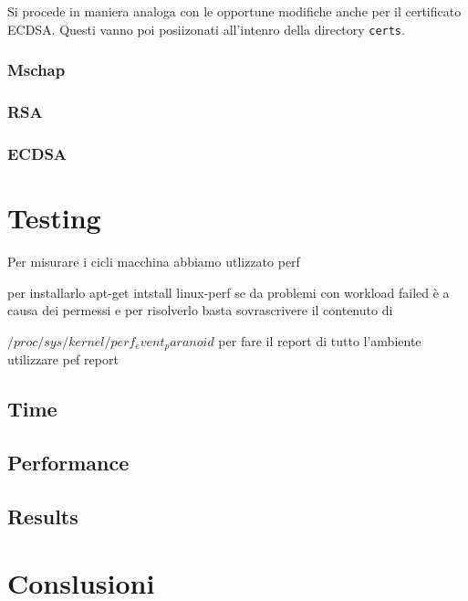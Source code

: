 \documentclass[
10pt, %
a4paper, %
oneside, %
headinclude,footinclude, %
BCOR5mm, %
]{scrartcl}
\begin{document}
\noindent
Si procede in maniera analoga con le opportune modifiche anche per il certificato ECDSA. Questi vanno poi posiizonati all'intenro della
directory \lstinline|certs|.


\subsubsection{Mschap}

\subsubsection{RSA}

\subsubsection{ECDSA}



\newpage
\section{Testing}

Per misurare i cicli macchina abbiamo utlizzato perf 

per installarlo apt-get intstall linux-perf se da problemi con workload failed è a causa dei permessi e per risolverlo basta sovrascrivere il contenuto di


$/proc/sys/kernel/perf_event_paranoid$
per fare il report di tutto l'ambiente utilizzare pef report
\subsection{Time}

\subsection{Performance}

\subsection{Results}

\section{Conslusioni}
\end{document}
